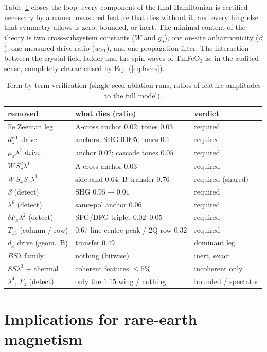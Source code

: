 \documentclass[aps,prb,twocolumn,superscriptaddress,longbibliography]{revtex4-2}
\begin{document}
Table~\ref{tab:audit} closes the loop: every component of the final
Hamiltonian is certified necessary by a named measured feature that
dies without it, and everything else that symmetry allows is zero,
bounded, or inert.  The minimal content of the theory is two
cross-subsystem constants ($W$ and $g_d$), one on-site anharmonicity
($\beta$), one measured drive ratio ($w_{E1}$), and one propagation
filter.  The interaction between the crystal-field ladder and the
spin waves of TmFeO$_3$ is, in the audited sense, completely
characterised by Eq.~(\ref{eq:faces}).

\begin{table}[t]
\caption{Term-by-term verification (single-seed ablation runs; ratios
of feature amplitudes to the full model).}
\label{tab:audit}
\centering\small
\renewcommand{\arraystretch}{1.2}
\begin{tabular}{lll}
\hline
removed & what dies (ratio) & verdict\\
\hline
Fe Zeeman leg & A-cross anchor $0.02$; tones $0.03$ & required\\
$d_z^{\rm eff}$ drive & anchors, SHG $0.005$; tones $0.1$ & required\\
$\mu_x\lambda^7$ drive & anchor $0.02$; cascade tones $0.05$ & required\\
$W\,S_y^2\lambda^1$ & A-cross anchor $0.03$ & required\\
$W\,S_xS_z\lambda^1$ & sideband $0.64$; B transfer $0.76$ & required (shared)\\
$\beta$ (detect) & SHG $0.95\to0.01$ & required\\
$\lambda^6$ (detect) & same-pol anchor $0.06$ & required\\
$\delta F_x\lambda^2$ (detect) & SFG/DFG triplet $0.02$--$0.05$ & required\\
$T_{13}$ (column / row) & $0.67$ line-centre peak / 2Q row $0.32$ & required\\
$d_x$ drive (geom.\ B) & transfer $0.49$ & dominant leg\\
$B S\lambda$ family & nothing (bitwise) & inert, exact\\
$SS\lambda^3$ + thermal & coherent features $\leq5\%$ & incoherent only\\
$\lambda^4$, $F_z$ (detect) & only the $1.15$ wing / nothing & bounded / spectator\\
\hline
\end{tabular}
\end{table}

\section{Implications for rare-earth magnetism}
\label{sec:physics}
\end{document}
